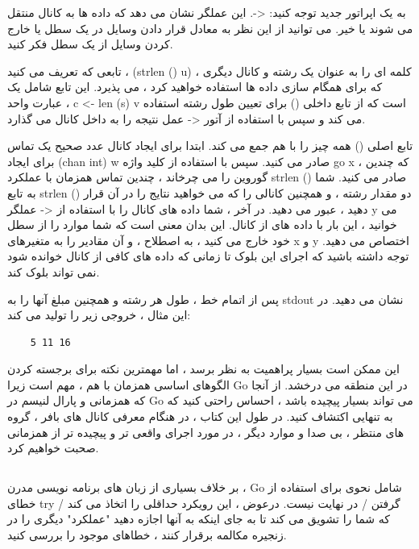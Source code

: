 \documentclass[12pt]{book}
\begin{document}
به یک اپراتور جدید توجه کنید: <-. این عملگر نشان می دهد که داده ها به کانال منتقل می شوند یا خیر. می توانید از این نظر به معادل قرار دادن وسایل در یک سطل یا خارج کردن وسایل از یک سطل فکر کنید.

تابعی که تعریف می کنید ، (strlen () u) ، کلمه ای را به عنوان یک رشته و کانال دیگری که برای همگام سازی داده ها استفاده خواهید کرد ، می پذیرد. این تابع شامل یک عبارت واحد ، c <- len (s) v است که از تابع داخلی () برای تعیین طول رشته استفاده می کند و سپس با استفاده از آتور <- عمل نتیجه را به داخل کانال می گذارد.

تابع اصلی () همه چیز را با هم جمع می کند. ابتدا برای ایجاد کانال عدد صحیح یک تماس برای ایجاد (chan int) w صادر می کنید. سپس با استفاده از کلید واژه go x ، که چندین گوروین را می چرخاند ، چندین تماس همزمان با عملکرد strlen () صادر می کنید. شما به تابع strlen () دو مقدار رشته ، و همچنین كانالی را كه می خواهید نتایج را در آن قرار دهید ، عبور می دهید. در آخر ، شما داده های کانال را با استفاده از <- عملگر y می خوانید ، این بار با داده های از کانال. این بدان معنی است که شما موارد را از سطل خود خارج می کنید ، به اصطلاح ، و آن مقادیر را به متغیرهای x و y اختصاص می دهید. توجه داشته باشید که اجرای این بلوک تا زمانی که داده های کافی از کانال خوانده شود نمی تواند بلوک کند.

پس از اتمام خط ، طول هر رشته و همچنین مبلغ آنها را به stdout نشان می دهید. در این مثال ، خروجی زیر را تولید می کند:
\begin{latin}
	\begin{lstlisting}
	5 11 16
	\end{lstlisting}
\end{latin}

این ممکن است بسیار پراهمیت به نظر برسد ، اما مهمترین نکته برای برجسته کردن الگوهای اساسی همزمان با هم ، مهم است زیرا Go در این منطقه می درخشد. از آنجا که همزمانی و پارال لنیسم در Go می تواند بسیار پیچیده باشد ، احساس راحتی کنید که به تنهایی اکتشاف کنید. در طول این کتاب ، در هنگام معرفی کانال های بافر ، گروه های منتظر ، بی صدا و موارد دیگر ، در مورد اجرای واقعی تر و پیچیده تر از همزمانی صحبت خواهیم کرد.
\subsection{}
بر خلاف بسیاری از زبان های برنامه نویسی مدرن ، Go شامل نحوی برای استفاده از خطای try / گرفتن / در نهایت نیست. درعوض ، این رویکرد حداقلی را اتخاذ می کند که شما را تشویق می کند تا به جای اینکه به آنها اجازه دهید "عملکرد" دیگری را در زنجیره مکالمه برقرار کنند ، خطاهای موجود را بررسی کنید.
\end{document}
